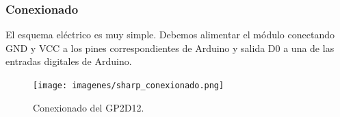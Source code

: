 \subsubsection{Conexionado}

El esquema eléctrico es muy simple. Debemos alimentar el módulo conectando GND y
VCC a los pines correspondientes de Arduino y salida D0 a una de las entradas digitales
de Arduino.\\

 \begin{figure}[H]
  \begin{center}
    \texttt{[image: imagenes/sharp\_conexionado.png]}
  \end{center}
  \caption{Conexionado del GP2D12.}
  \label{figura:pines_sharp}
\end{figure}

